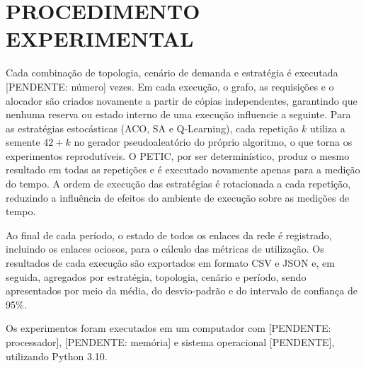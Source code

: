 \section{PROCEDIMENTO EXPERIMENTAL}
\label{sec:procedimento}

Cada combinação de topologia, cenário de demanda e estratégia é executada [PENDENTE: número] vezes. Em cada execução, o grafo, as requisições e o alocador são criados novamente a partir de cópias independentes, garantindo que nenhuma reserva ou estado interno de uma execução influencie a seguinte. Para as estratégias estocásticas (ACO, SA e Q-Learning), cada repetição $k$ utiliza a semente $42 + k$ no gerador pseudoaleatório do próprio algoritmo, o que torna os experimentos reprodutíveis. O PETIC, por ser determinístico, produz o mesmo resultado em todas as repetições e é executado novamente apenas para a medição do tempo. A ordem de execução das estratégias é rotacionada a cada repetição, reduzindo a influência de efeitos do ambiente de execução sobre as medições de tempo.

Ao final de cada período, o estado de todos os enlaces da rede é registrado, incluindo os enlaces ociosos, para o cálculo das métricas de utilização. Os resultados de cada execução são exportados em formato CSV e JSON e, em seguida, agregados por estratégia, topologia, cenário e período, sendo apresentados por meio da média, do desvio-padrão e do intervalo de confiança de 95\%. %

Os experimentos foram executados em um computador com [PENDENTE: processador], [PENDENTE: memória] e sistema operacional [PENDENTE], utilizando Python 3.10.

